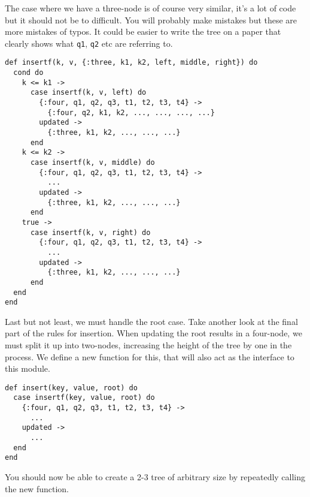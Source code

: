 \documentclass[a4paper,11pt]{article}
\begin{document}
The case where we have a three-node is of course very similar, it's a
lot of code but it should not be to difficult. You will probably make
mistakes but these are more mistakes of typos. It could be easier to
write the tree on a paper that clearly shows what {\tt q1}, {\tt q2}
etc are referring to.

\begin{verbatim}
def insertf(k, v, {:three, k1, k2, left, middle, right}) do
  cond do
    k <= k1 ->
      case insertf(k, v, left) do
        {:four, q1, q2, q3, t1, t2, t3, t4} ->
          {:four, q2, k1, k2, ..., ..., ..., ...}
        updated ->
          {:three, k1, k2, ..., ..., ...}
      end
    k <= k2 ->
      case insertf(k, v, middle) do
        {:four, q1, q2, q3, t1, t2, t3, t4} ->
          ...
        updated ->
          {:three, k1, k2, ..., ..., ...}
      end
    true ->
      case insertf(k, v, right) do
        {:four, q1, q2, q3, t1, t2, t3, t4} ->
          ...
        updated ->
          {:three, k1, k2, ..., ..., ...}
      end
  end
end
\end{verbatim}

Last but not least, we must handle the root case. Take another look at the
final part of the rules for insertion. When updating the root results in a
four-node, we must split it up into two-nodes, increasing the height of the
tree by one in the process. We define a new function for this, that will
also act as the interface to this module.

\begin{verbatim}
def insert(key, value, root) do
  case insertf(key, value, root) do
    {:four, q1, q2, q3, t1, t2, t3, t4} ->
      ...
    updated ->
      ...
  end
end
\end{verbatim}

You should now be able to create a 2-3 tree of arbitrary size by repeatedly
calling the new function.
\end{document}
